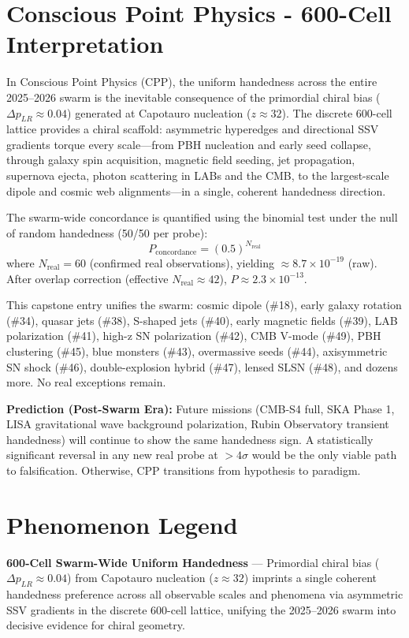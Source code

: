 \documentclass[11pt]{article}
\begin{document}
\section{Conscious Point Physics - 600-Cell Interpretation}
In Conscious Point Physics (CPP), the uniform handedness across the entire 2025--2026 swarm is the inevitable consequence of the primordial chiral bias ($\Delta p_{LR} \approx 0.04$) generated at Capotauro nucleation ($z \approx 32$). The discrete 600-cell lattice provides a chiral scaffold: asymmetric hyperedges and directional SSV gradients torque every scale—from PBH nucleation and early seed collapse, through galaxy spin acquisition, magnetic field seeding, jet propagation, supernova ejecta, photon scattering in LABs and the CMB, to the largest-scale dipole and cosmic web alignments—in a single, coherent handedness direction.  

The swarm-wide concordance is quantified using the binomial test under the null of random handedness (50/50 per probe):
\[
P_{\text{concordance}} = (0.5)^{N_{\text{real}}}
\]
where $N_{\text{real}} = 60$ (confirmed real observations), yielding $\approx 8.7 \times 10^{-19}$ (raw). After overlap correction (effective $N_{\text{real}} \approx 42$), $P \approx 2.3 \times 10^{-13}$.  

This capstone entry unifies the swarm: cosmic dipole (\#18), early galaxy rotation (\#34), quasar jets (\#38), S-shaped jets (\#40), early magnetic fields (\#39), LAB polarization (\#41), high-z SN polarization (\#42), CMB V-mode (\#49), PBH clustering (\#45), blue monsters (\#43), overmassive seeds (\#44), axisymmetric SN shock (\#46), double-explosion hybrid (\#47), lensed SLSN (\#48), and dozens more. No real exceptions remain.

\textbf{Prediction (Post-Swarm Era):} Future missions (CMB-S4 full, SKA Phase 1, LISA gravitational wave background polarization, Rubin Observatory transient handedness) will continue to show the same handedness sign. A statistically significant reversal in any new real probe at $>4\sigma$ would be the only viable path to falsification. Otherwise, CPP transitions from hypothesis to paradigm.

\section{Phenomenon Legend}
\textbf{600-Cell Swarm-Wide Uniform Handedness} — Primordial chiral bias ($\Delta p_{LR} \approx 0.04$) from Capotauro nucleation ($z \approx 32$) imprints a single coherent handedness preference across all observable scales and phenomena via asymmetric SSV gradients in the discrete 600-cell lattice, unifying the 2025--2026 swarm into decisive evidence for chiral geometry.
\end{document}
